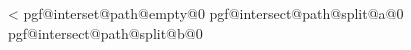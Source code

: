 {		%
		\def\c@pgfpathfilled@counter{0}%
		\pgfmathloop
		\ifnum\c@pgfpathfilled@counter<\pgfpathfilled@a@segments\relax
			\csname pgf@interset@path@empty@\c@pgfpathfilled@counter\endcsname
				\expandafter\let\expandafter\pgf@loc@path@a\csname pgf@intersect@path@split@a@\c@pgfpathfilled@counter\endcsname
				\expandafter\let\expandafter\pgf@loc@path@b\csname pgf@intersect@path@split@b@\c@pgfpathfilled@counter\endcsname
				\pgfpathfillbetween@compute{\pgf@loc@path@a}{\pgf@loc@path@b}%
			\fi
			\pgfutil@advancestringcounter\c@pgfpathfilled@counter
		\repeatpgfmathloop
	\fi
}

\def\pgflibraryfillbetweenemptysegmenttolerance{1pt}

\def\pgfpathfillbetween@compute@checkempty#1{%
	\def\pgfretval{0}%
	\pgf@compute@BB{#1}%
	\advance\pgf@xb by-\pgf@xa
	\advance\pgf@yb by-\pgf@ya
	\ifdim\pgf@xb<\pgflibraryfillbetweenemptysegmenttolerance\relax
		\def\pgfretval{1}%
	\fi
	\ifdim\pgf@yb<\pgflibraryfillbetweenemptysegmenttolerance\relax
		\def\pgfretval{1}%
	\fi
}

\def\pgfpathfillbetween@compute#1#2{%
	\if1\pgfpathfillbetween@reverse@mode
		\pgf@reverse@path{#2}%
		\let#2=\pgfretval
	\fi
	\pgfpathfillbetween@contains@closepathtoken{#1}%
	\let\b@pgfpathfillbetween@contains@close@a=\pgfretval
	\pgfpathfillbetween@contains@closepathtoken{#2}%
	\let\b@pgfpathfillbetween@contains@close@b=\pgfretval
	\def\b@pgfpathfillbetween@contains@close{0}%
	\if1\b@pgfpathfillbetween@contains@close@b
		\def\b@pgfpathfillbetween@contains@close{1}%
	\fi
	\if1\b@pgfpathfillbetween@contains@close@a
		\def\b@pgfpathfillbetween@contains@close{1}%
	\fi
	\if0\b@pgfpathfillbetween@contains@close@b
		\expandafter\pgfpathfillbetween@replace@first@moveto#2\pgf@stop
		\let#2=\pgfretval
	\fi
	\t@pgf@toka=\expandafter{#1}%
	\t@pgf@tokb=\expandafter{#2}%
	\if0\b@pgfpathfillbetween@contains@close
		\expandafter\pgfpathfillbetween@get@first@coord#1\pgf@stop
		\t@pgf@tokc=\expandafter{\expandafter\pgfsyssoftpath@closepathtoken\pgfretval}%
	\else
		\t@pgf@tokc={}%
	\fi
	\edef\pgfretval{\the\t@pgf@toka\the\t@pgf@tokb\the\t@pgf@tokc}%
}

